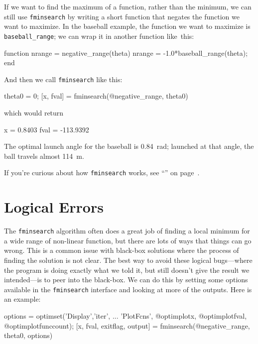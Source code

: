 \documentclass[../../book.tex]{subfiles}
\begin{document}
If we want to find the maximum of a function, rather than the minimum, we can still use \lstinline{fminsearch} by writing a short function that negates the function we want to maximize.
In the baseball example, the function we want to maximize is \lstinline{baseball_range}; we can wrap it in another function like~this:

\begin{code}
function nrange = negative_range(theta)
nrange = -1.0*baseball_range(theta);
end
\end{code}

And then we call \lstinline{fminsearch} like this:

\begin{code}
    theta0 = 0;
    [x, fval] = fminsearch(@negative_range, theta0)
\end{code}
which would return
\begin{code}
    x =
    0.8403
fval =
 -113.9392
\end{code}

The optimal launch angle for the baseball is \SI{0.84}{\radian}; launched at that angle, the ball travels almost \SI{114}{\meter}.

If you're curious about how \lstinline{fminsearch} works, see ``'' on page~\pageref{howfminsearch}.

\section{Logical Errors}

The \lstinline{fminsearch} algorithm often does a great job of finding a local minimum for a wide range of non-linear function, but there are lots of ways that things can go wrong.  This is a common issue with black-box solutions where the process of finding the solution is not clear.   The best way to avoid these logical bugs---where the program is doing exactly what we told it, but still doesn't give the result we intended---is to peer into the black-box. We can do this by setting some options available in the \lstinline{fminsearch} interface and looking at more of the outputs.  Here is an example:

\begin{code}
    options = optimset('Display','iter', ...
        'PlotFcns', {@optimplotx, @optimplotfval, @optimplotfunccount});
    [x, fval, exitflag, output] = fminsearch(@negative_range, theta0, options)
\end{code}
\end{document}
